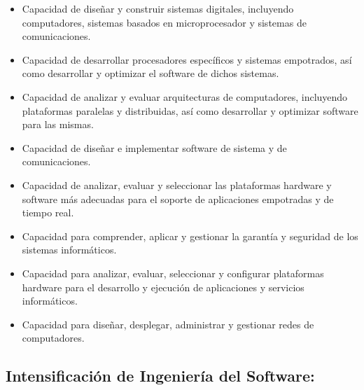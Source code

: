 \documentclass{pre-tfg}
\begin{document}
\begin{itemize}
\item Capacidad de diseñar y construir sistemas digitales, incluyendo computadores,
  sistemas basados en microprocesador y sistemas de comunicaciones.
\item Capacidad de desarrollar procesadores específicos y sistemas empotrados, así como
  desarrollar y optimizar el software de dichos sistemas.
\item Capacidad de analizar y evaluar arquitecturas de computadores, incluyendo
  plataformas paralelas y distribuidas, así como desarrollar y optimizar software para las
  mismas.
\item Capacidad de diseñar e implementar software de sistema y de comunicaciones.
\item Capacidad de analizar, evaluar y seleccionar las plataformas hardware y software más
  adecuadas para el soporte de aplicaciones empotradas y de tiempo real.
\item Capacidad para comprender, aplicar y gestionar la garantía y seguridad de los sistemas informáticos.
\item Capacidad para analizar, evaluar, seleccionar y configurar plataformas hardware para
  el desarrollo y ejecución de aplicaciones y servicios informáticos.
\item Capacidad para diseñar, desplegar, administrar y gestionar redes de computadores.
\end{itemize}


\subsection*{Intensificación de Ingeniería del Software:}
\end{document}
